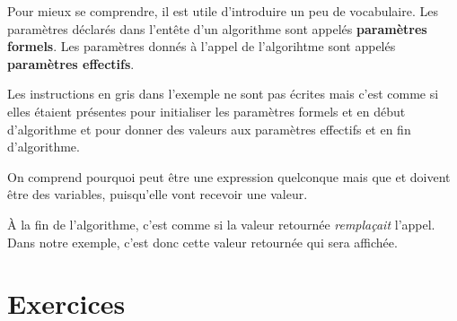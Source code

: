 	Pour mieux se comprendre,
	il est utile d'introduire un peu de vocabulaire.
	Les paramètres déclarés dans l'entête d'un algorithme
	sont appelés \textbf{paramètres formels}.
	Les paramètres donnés à l'appel de l'algorihtme
	sont appelés \textbf{paramètres effectifs}. 
	
	Les instructions en gris dans l'exemple ne sont pas écrites
	mais c'est comme si elles étaient présentes
	pour initialiser les paramètres formels \In{} et \InOut{}
	en début d'algorithme
	et pour donner des valeurs 
	aux paramètres effectifs \Out{} et \InOut{}
	en fin d'algorithme.
	
	On comprend pourquoi  peut être une expression quelconque
	mais que  et  doivent être des variables,
	puisqu'elle vont recevoir une valeur.
	
	À la fin de l'algorithme, 
	c'est comme si la valeur retournée \emph{remplaçait} l'appel.
	Dans notre exemple, c'est donc cette valeur retournée
	qui sera affichée.
	
\section{Exercices}

